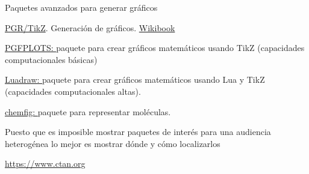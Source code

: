 \documentclass[10pt]{beamer}
\begin{document}
\begin{frame}[fragile]{Paquetes avanzados para generar gráficos}


\href{https://pgf-tikz.github.io/pgf/pgfmanual.pdf}{\color{blue}PGR/TikZ}. Generación de gráficos. \href{https://es.wikibooks.org/w/index.php?title=Manual_de_LaTeX/Inclusi%C3%B3n_de_gr%C3%A1ficos/Gr%C3%A1ficos_con_TikZ}{\color{blue}Wikibook}

\href{https://ctan.fisiquimicamente.com/graphics/pgf/contrib/pgfplots/doc/pgfplots.pdf}{\color{blue}PGFPLOTS: }paquete para crear gráficos matemáticos usando TikZ (capacidades computacionales básicas)

\href{https://mist.dsic.upv.es/tex-archive/macros/luatex/latex/luadraw/doc/luadraw-doc-en.pdf}{\color{blue}Luadraw: } paquete para crear gráficos matemáticos usando Lua y TikZ (capacidades computacionales altas).

\href{https://ctan.javinator9889.com/macros/generic/chemfig/chemfig-en.pdf}{\color{blue}chemfig: } paquete para representar moléculas.

Puesto que es imposible mostrar paquetes de interés para una 
audiencia heterogénea lo mejor es mostrar dónde y cómo localizarlos

\href{https://www.ctan.org}{\color{blue}https://www.ctan.org}


\end{frame}


%
%
\end{document}
